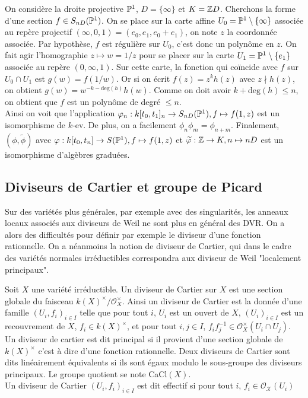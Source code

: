 \begin{ex}
On considère la droite projective $\mathbb{P}^1$, $D=\lbrace\infty\rbrace$ et $K=\mathbb{Z} D$. Cherchons la forme d'une section $f\in S_{nD}(\mathbb{P}^1)$. On se place sur la carte affine $U_0=\mathbb{P}^1\setminus \lbrace \infty\rbrace$ associée au repère projectif $(\infty, 0, 1)=(e_0,e_1,e_0+e_1)$, on note $z$ la coordonnée associée. Par hypothèse, $f$ est régulière sur $U_0$, c'est donc un polynôme en $z$. On fait agir l'homographie $z\mapsto w=1/z$  pour se placer sur la carte $U_1=\mathbb{P}^1\setminus \lbrace e_1 \rbrace$ associée au repère $(0, \infty,1)$. Sur cette carte, la fonction qui coïncide avec $f$ sur $U_0\cap U_1$ est $g(w)=f(1/w)$. Or si on écrit $f(z)=z^kh(z)$ avec $z\nmid h(z)$, on obtient $g(w)=w^{-k-\textrm{deg}(h)}h(w)$. Comme on doit avoir $k+\textrm{deg}(h)\leq n$, on obtient que $f$ est un polynôme de degré $\leq n$.\\
Ainsi on voit que l'application $\varphi_n:k[t_0,t_1]_n\rightarrow S_{nD}(\mathbb{P}^1), f\mapsto f(1,z)$ est un isomorphisme de $k$-ev. De plus, on a facilement $\phi_n\phi_m=\phi_{n+m}$. Finalement, $(\phi, \widetilde{\phi})$ avec $\varphi: k[t_0,t_n]\rightarrow S(\mathbb{P}^1), f\mapsto f(1,z)$ et $\widetilde{\varphi}:\mathbb{Z}\rightarrow K, n\mapsto nD$ est un isomorphisme d'algèbres graduées.
\end{ex}

\subsection{Diviseurs de Cartier et groupe de Picard}

Sur des variétés plus générales, par exemple avec des singularités, les anneaux locaux associés aux diviseurs de Weil ne sont plus en général des DVR. On a alors des difficultés pour définir par exemple le diviseur d'une fonction rationnelle. On a néanmoins la notion de diviseur de Cartier, qui dans le cadre des variétés normales irréductibles correspondra aux diviseur de Weil "localement principaux".

\begin{defn}
Soit $X$ une variété irréductible. Un diviseur de Cartier sur $X$ est une section globale du faisceau $k(X)^\times/\mathcal{O}_X^\times$. Ainsi un diviseur de Cartier est la donnée d'une famille $(U_i, f_i)_{i\in I}$ telle que pour tout $i$, $U_i$ est un ouvert de $X$, $(U_i)_{i\in I}$ est un recouvrement de $X$, $f_i\in k(X)^\times$, et pour tout $i,j \in I$, $f_if_j^{-1}\in \mathcal{O}_X^\times(U_i\cap U_j)$.\\
Un diviseur de cartier est dit principal si il provient d'une section globale de $k(X)^\times$ c'est à dire d'une fonction rationnelle. Deux diviseurs de Cartier sont dits linéairement équivalents si ils sont égaux modulo le sous-groupe des diviseurs principaux. Le groupe quotient se note CaCl$(X)$.\\
Un diviseur de Cartier $(U_i, f_i)_{i\in I}$ est dit effectif si pour tout $i$, $f_i\in \mathcal{O_X}(U_i)$
\end{defn}

